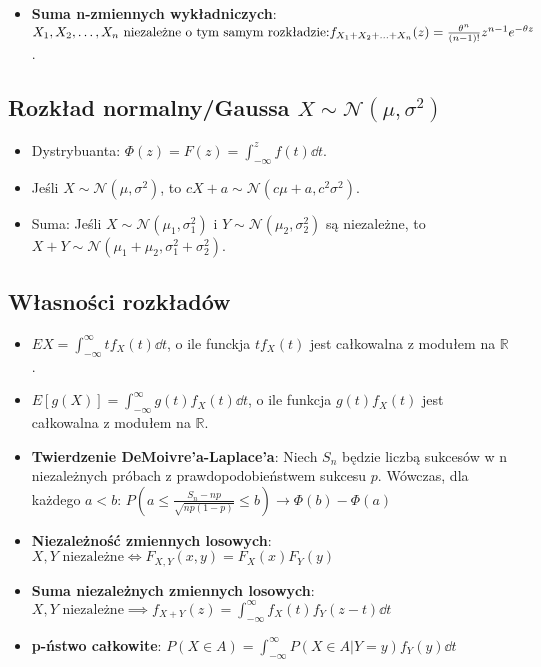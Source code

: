 \documentclass{article}
\theoremstyle{definition}
\theoremstyle{remark}
\begin{document}
\begin{multicols}{2}
\begin{itemize}[itemsep=0pt, left=0pt]
        \item \textbf{Suma n-zmiennych wykładniczych}: \(X_1, X_2, \ldots, X_n \\
        \text{ niezależne o tym samym rozkładzie:} \\
         f_{X_1 + X_2 + \ldots + X_n}(z) =  \frac{\theta^n}{(n-1)!}z^{n-1}e^{-\theta z}\).
    \end{itemize}

    \subsection*{Rozkład normalny/Gaussa \( X \sim \mathcal{N}(\mu, \sigma^2) \)}
    \begin{itemize}[itemsep=0pt, left=0pt]
        \item Dystrybuanta: \(\Phi(z)=F(z) = \int_{-\infty}^{z} f(t) \dd{t}\).
        \item Jeśli \(X \sim \mathcal{N}(\mu, \sigma^2)\), to \(cX+a \sim \mathcal{N}(c\mu+a, c^2\sigma^2)\).
        \item Suma: Jeśli \( X \sim \mathcal{N}(\mu_1, \sigma_1^2) \) i \( Y \sim \mathcal{N}(\mu_2, \sigma_2^2) \) są niezależne, to \( X+Y \sim \mathcal{N}(\mu_1+\mu_2, \sigma_1^2+\sigma_2^2) \).
    \end{itemize}

    \subsection*{Własności rozkładów}

    \begin{itemize}[itemsep=0pt, left=0pt]
        \item \(EX = \int_{-\infty}^{\infty}{tf_X(t) \dd{t}}\), o ile funckja \(tf_X(t)\) jest całkowalna z modułem na \(\mathbb{R}\).
        \item \(E[g(X)] = \int_{-\infty}^{\infty}{g(t)f_X(t) \dd{t}}\), o ile funkcja \(g(t)f_X(t)\) jest całkowalna z modułem na \(\mathbb{R}\).
        \item \textbf{Twierdzenie DeMoivre'a-Laplace'a}: Niech \(S_n\) będzie liczbą sukcesów w n niezależnych próbach z
        prawdopodobieństwem sukcesu \(p\). Wówczas, dla każdego \(a < b\): \(P(a \leq \frac{S_n - np}{\sqrt{np(1-p)}} \leq b) \to \Phi(b) - \Phi(a)\)
        \item \textbf{Niezależność zmiennych losowych}: \(X,Y \text{ niezależne} \iff F_{X,Y}(x,y) = F_X(x)F_Y(y)\)
        \item \textbf{Suma niezależnych zmiennych losowych}: \(X,Y \text{ niezależne} \implies f_{X+Y}(z) = \int_{-\infty}^{\infty}{f_X(t)f_Y(z-t) \dd{t}}\)
        \item \textbf{p-ństwo całkowite}: \(P(X \in A) = \int_{-\infty}^{\infty}{P(X \in A | Y = y) f_Y(y) \dd{t}}\)
    \end{itemize}


\end{multicols}
\end{document}
